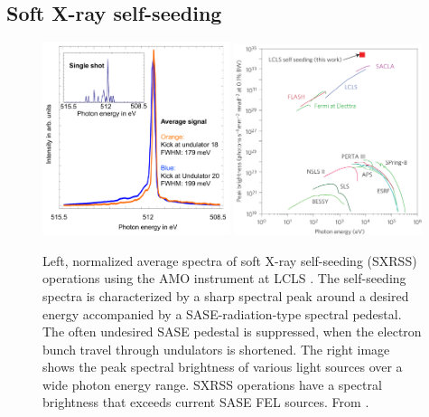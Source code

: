 \subsection{Soft X-ray self-seeding}
\begin{figure}
	\centering
		\includegraphics[width=0.49\textwidth]{images/Soft-X-ray-self-seeding.pdf}
		\includegraphics[width=0.49\textwidth]{images/spectral-brightness-fletcher-2015.jpg}
	\caption[Soft X-ray self-seeding spectra and brilliance of various lightsources.]{Left, normalized average spectra of soft X-ray self-seeding (SXRSS) operations using the AMO instrument at LCLS \cite[see][]{Bucher-2014-Unpublished}. The self-seeding spectra is characterized by a sharp spectral peak around a desired energy accompanied by a SASE-radiation-type spectral pedestal. The often undesired SASE pedestal is suppressed, when the electron bunch travel through undulators is shortened. The right image shows the peak spectral brightness of various light sources over a wide photon energy range. SXRSS operations have a spectral brightness that exceeds current SASE FEL sources. From \citep{Fletcher-2015-NatPho}.}
	\label{fig:soft-xray-self-seeding}
\end{figure}
